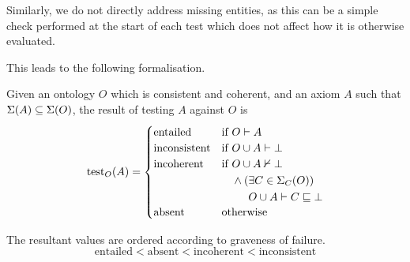 \documentclass[paper.tex]{subfiles}
\begin{document}
Similarly, we do not directly address missing entities, as this can be a simple check performed at the start of each test which does not affect how it is otherwise evaluated.

This leads to the following formalisation.

\begin{definition}
  Given an ontology $O$ which is consistent and coherent, and an axiom $A$ such that $\Sigma(A) \subseteq \Sigma(O)$, the result of testing $A$ against $O$ is
  \[
    \test_O(A) =
    \begin{cases}
      \mathrm{entailed} &
        \text{if } O \sementails A \\
      \mathrm{inconsistent} &
        \text{if } O \union A \sementails \bot \\
      \mathrm{incoherent} &
        \text{if }
        \! \begin{aligned}[t]
          & O \union A \nsementails \bot \\
          & \land (\exists C \in \signatureC(O)) \\
          & \phantom{{}\land (} O \union A \sementails C \sqsubseteq \bot
        \end{aligned} \\
      \mathrm{absent} &
        \text {otherwise} \\
    \end{cases}
  \]

  The resultant values are ordered according to graveness of failure.
  \[ \mathrm{entailed} < \mathrm{absent} < \mathrm{incoherent} < \mathrm{inconsistent} \]
\end{definition}
\end{document}
